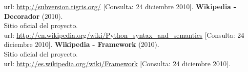 \begin{thebibliography}{xx}
         url: \url{http://subversion.tigris.org/}
         [Consulta: 24 diciembre 2010].
 \textbf{Wikipedia - Decorador} (2010).\\
         Sitio oficial del proyecto.\\
         url: \url{http://en.wikipedia.org/wiki/Python_syntax_and_semantics}
         [Consulta: 24 diciembre 2010].
 \textbf{Wikipedia - Framework} (2010).\\
         Sitio oficial del proyecto.\\
         url: \url{http://es.wikipedia.org/wiki/Framework}
         [Consulta: 24 diciembre 2010].
 \end{thebibliography}